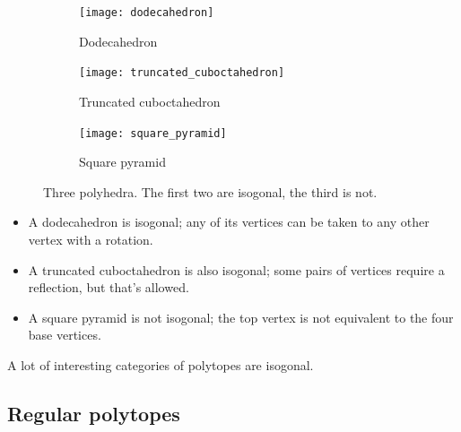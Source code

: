 \documentclass{article}
\begin{document}
\begin{figure}[H]
  \centering
  \begin{subfigure}{.33333\textwidth}
    \centering
    \texttt{[image: dodecahedron]}
    \caption{Dodecahedron}
    \label{fig:doe}
  \end{subfigure}%
  \begin{subfigure}{.33333\textwidth}
    \centering
    \texttt{[image: truncated\_cuboctahedron]}
    \caption{Truncated cuboctahedron}
    \label{fig:girco}
  \end{subfigure}%
  \begin{subfigure}{.33333\textwidth}
    \centering
    \texttt{[image: square\_pyramid]}
    \caption{Square pyramid}
    \label{fig:squippy}
  \end{subfigure}%
  \caption{Three polyhedra. The first two are isogonal, the third is not.}
  \label{fig:polyhedra1}
\end{figure}

\begin{itemize}
\item A dodecahedron is isogonal; any of its vertices can be taken to any other vertex with a rotation.
\item A truncated cuboctahedron is also isogonal; some pairs of vertices require a reflection, but
that's allowed.
\item A square pyramid is not isogonal; the top vertex is not equivalent to the four base vertices.
\end{itemize}

A lot of interesting categories of polytopes are isogonal.

\subsection{Regular polytopes}
\end{document}
